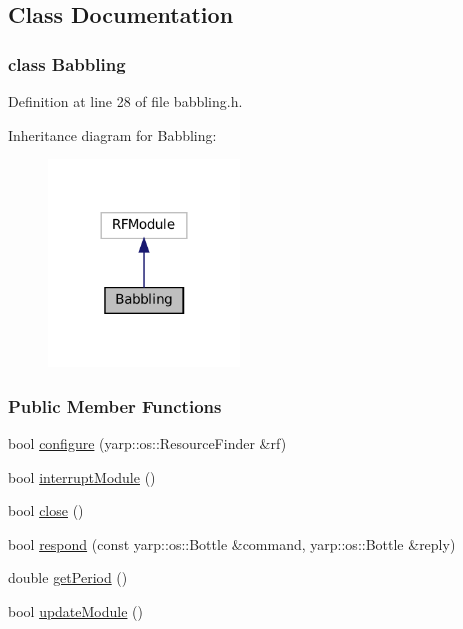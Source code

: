 \subsection{Class Documentation}
\label{classBabbling}
\subsubsection{class Babbling}


Definition at line 28 of file babbling.\+h.



Inheritance diagram for Babbling\+:
\nopagebreak
\begin{figure}[H]
\begin{center}
\leavevmode
\includegraphics[width=144pt]{classBabbling__inherit__graph}
\end{center}
\end{figure}
\subsubsection*{Public Member Functions}
\begin{DoxyCompactItemize}
\item 
bool \hyperlink{group__babbling_ac1c06a6f076dc3b824799be9b24e6cd1}{configure} (yarp\+::os\+::\+Resource\+Finder \&rf)
\item 
bool \hyperlink{group__babbling_a1f29bf6caa9392f3f99af13df900b05f}{interrupt\+Module} ()
\item 
bool \hyperlink{group__babbling_adb907b4b4a41807f128b1b877751eb83}{close} ()
\item 
bool \hyperlink{group__babbling_ade91925b1045c2d45603e49e8fa45356}{respond} (const yarp\+::os\+::\+Bottle \&command, yarp\+::os\+::\+Bottle \&reply)
\item 
double \hyperlink{group__babbling_a902a318d5b14fcf5a19bb7272abd49e2}{get\+Period} ()
\item 
bool \hyperlink{group__babbling_a214e419246e93718c263850171a67a31}{update\+Module} ()
\end{DoxyCompactItemize}
